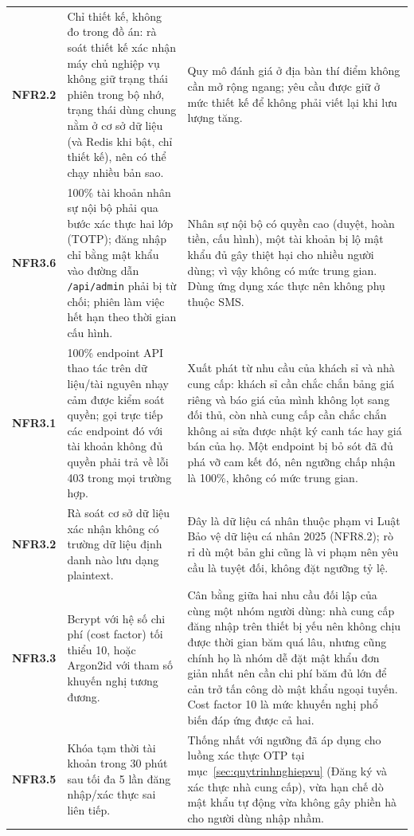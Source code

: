 \begin{longtable}{L{1.67cm} L{6.67cm} L{6.56cm}}
\textbf{NFR2.2} &
Chỉ thiết kế, không đo trong đồ án: rà soát thiết kế xác nhận máy chủ nghiệp vụ không giữ trạng thái phiên trong bộ nhớ, trạng thái dùng chung nằm ở cơ sở dữ liệu (và Redis khi bật, chỉ thiết kế), nên có thể chạy nhiều bản sao. &
Quy mô đánh giá ở địa bàn thí điểm không cần mở rộng ngang; yêu cầu được giữ ở mức thiết kế để không phải viết lại khi lưu lượng tăng. \\
\textbf{NFR3.6} &
100\% tài khoản nhân sự nội bộ phải qua bước xác thực hai lớp (TOTP); đăng nhập chỉ bằng mật khẩu vào đường dẫn \texttt{/api/admin} phải bị từ chối; phiên làm việc hết hạn theo thời gian cấu hình. &
Nhân sự nội bộ có quyền cao (duyệt, hoàn tiền, cấu hình), một tài khoản bị lộ mật khẩu đủ gây thiệt hại cho nhiều người dùng; vì vậy không có mức trung gian. Dùng ứng dụng xác thực nên không phụ thuộc SMS. \\
\textbf{NFR3.1} &
100\% endpoint API thao tác trên dữ liệu/tài nguyên nhạy cảm được kiểm soát quyền; gọi trực tiếp các endpoint đó với tài khoản không đủ quyền phải trả về lỗi 403 trong mọi trường hợp. &
Xuất phát từ nhu cầu của khách sỉ và nhà cung cấp: khách sỉ cần chắc chắn bảng giá riêng và báo giá của mình không lọt sang đối thủ, còn nhà cung cấp cần chắc chắn không ai sửa được nhật ký canh tác hay giá bán của họ. Một endpoint bị bỏ sót đã đủ phá vỡ cam kết đó, nên ngưỡng chấp nhận là 100\%, không có mức trung gian. \\
\textbf{NFR3.2} &
Rà soát cơ sở dữ liệu xác nhận không có trường dữ liệu định danh nào lưu dạng plaintext. &
Đây là dữ liệu cá nhân thuộc phạm vi Luật Bảo vệ dữ liệu cá nhân 2025 (NFR8.2); rò rỉ dù một bản ghi cũng là vi phạm nên yêu cầu là tuyệt đối, không đặt ngưỡng tỷ lệ. \\
\textbf{NFR3.3} &
Bcrypt với hệ số chi phí (cost factor) tối thiểu 10, hoặc Argon2id với tham số khuyến nghị tương đương. &
Cân bằng giữa hai nhu cầu đối lập của cùng một nhóm người dùng: nhà cung cấp đăng nhập trên thiết bị yếu nên không chịu được thời gian băm quá lâu, nhưng cũng chính họ là nhóm dễ đặt mật khẩu đơn giản nhất nên cần chi phí băm đủ lớn để cản trở tấn công dò mật khẩu ngoại tuyến. Cost factor 10 là mức khuyến nghị phổ biến đáp ứng được cả hai. \\
\textbf{NFR3.5} &
Khóa tạm thời tài khoản trong 30 phút sau tối đa 5 lần đăng nhập/xác thực sai liên tiếp. &
Thống nhất với ngưỡng đã áp dụng cho luồng xác thực OTP tại mục~\ref{sec:quytrinhnghiepvu} (Đăng ký và xác thực nhà cung cấp), vừa hạn chế dò mật khẩu tự động vừa không gây phiền hà cho người dùng nhập nhầm. \\

\end{longtable}
